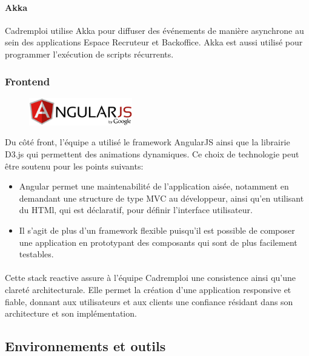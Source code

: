 \paragraph{Akka}
Cadremploi utilise Akka pour diffuser des événements de manière asynchrone au sein des applications Espace Recruteur et Backoffice.
Akka est aussi utilisé pour programmer l'exécution de scripts récurrents.

\subsubsection{Frontend}
\label{subs:Frontend}
\begin{figure}[h]
  \begin{center}
    \includegraphics[width=0.4\textwidth]{Pictures/angular_logo.png}
  \end{center}
\end{figure}
Du côté front, l'équipe a utilisé le framework AngularJS ainsi que la librairie D3.js qui permettent des animations dynamiques.
Ce choix de technologie peut être soutenu pour les points suivants:
\begin{itemize}
  \item Angular permet une maintenabilité de l'application aisée, notamment en demandant une structure de type MVC au développeur, ainsi qu'en utilisant du HTMl, qui est déclaratif, pour définir l'interface utilisateur.
  \item Il s'agit de plus d'un framework flexible puisqu'il est possible de composer une application en prototypant des composants qui sont de plus facilement testables.
\end{itemize}


\paragraph{}
Cette stack reactive assure à l'équipe Cadremploi une consistence ainsi qu'une clareté architecturale.
Elle permet la création d'une application responsive et fiable, donnant aux utilisateurs et aux clients une confiance résidant dans son architecture et son implémentation.

\subsection{Environnements et outils}
